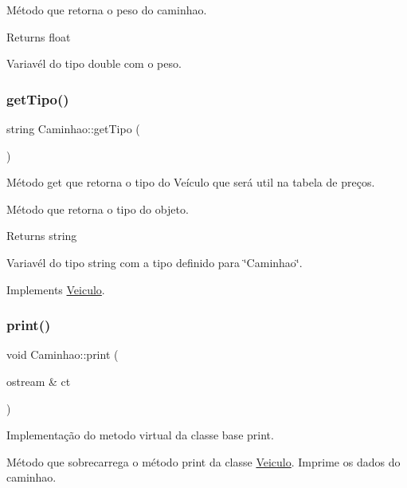 Método que retorna o peso do caminhao. \begin{DoxyReturn}{Returns}
float

Variavél do tipo double com o peso. 
\end{DoxyReturn}
\mbox{\label{classCaminhao_aa1d2138301b0c5c8c2e022309ab55bc0}} 
\subsubsection{\texorpdfstring{get\+Tipo()}{getTipo()}}
{\footnotesize\ttfamily string Caminhao\+::get\+Tipo (\begin{DoxyParamCaption}{ }\end{DoxyParamCaption})\hspace{0.3cm}{\ttfamily [virtual]}}



Método get que retorna o tipo do Veículo que será util na tabela de preços. 

Método que retorna o tipo do objeto. \begin{DoxyReturn}{Returns}
string

Variavél do tipo string com a tipo definido para \char`\"{}\+Caminhao\char`\"{}. 
\end{DoxyReturn}


Implements \hyperlink{classVeiculo}{Veiculo}.

\mbox{\label{classCaminhao_a5ba8b7a769a300b10595a4aa55ccbf8c}} 
\subsubsection{\texorpdfstring{print()}{print()}}
{\footnotesize\ttfamily void Caminhao\+::print (\begin{DoxyParamCaption}\item[{ostream \&}]{ct }\end{DoxyParamCaption})}



Implementação do metodo virtual da classe base \textquotesingle{}print\textquotesingle{}. 

Método que sobrecarrega o método print da classe \hyperlink{classVeiculo}{Veiculo}. Imprime os dados do caminhao.


